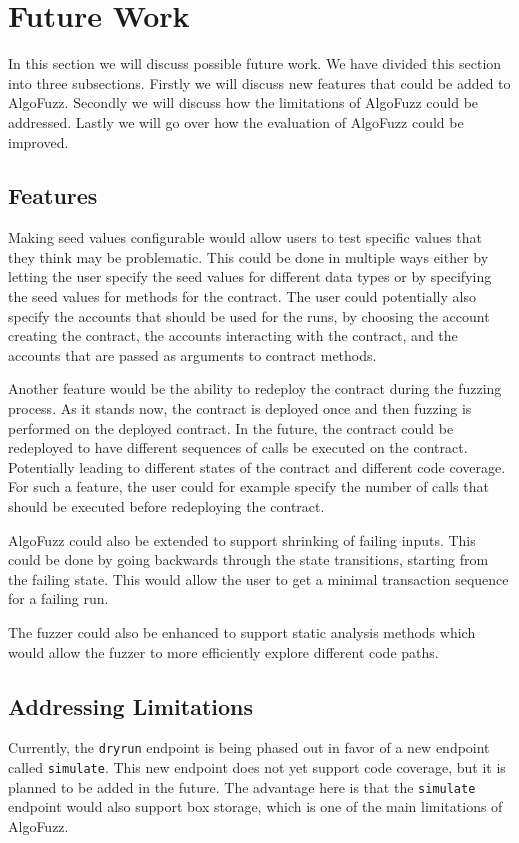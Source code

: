 \section*{Future Work}
In this section we will discuss possible future work.
We have divided this section into three subsections.
Firstly we will discuss new features that could be added to AlgoFuzz.
Secondly we will discuss how the limitations of AlgoFuzz could be addressed.
Lastly we will go over how the evaluation of AlgoFuzz could be improved.

\subsection*{Features}
Making seed values configurable would allow users to test specific values that they think may be problematic.
This could be done in multiple ways either by letting the user specify the seed values for different data types or by specifying the seed values for methods for the contract.
The user could potentially also specify the accounts that should be used for the runs, by choosing the account creating the contract, the accounts interacting with the contract, and the accounts that are passed as arguments to contract methods.

Another feature would be the ability to redeploy the contract during the fuzzing process.
As it stands now, the contract is deployed once and then fuzzing is performed on the deployed contract.
In the future, the contract could be redeployed to have different sequences of calls be executed on the contract.
Potentially leading to different states of the contract and different code coverage.
For such a feature, the user could for example specify the number of calls that should be executed before redeploying the contract.

AlgoFuzz could also be extended to support shrinking of failing inputs.
This could be done by going backwards through the state transitions, starting from the failing state.
This would allow the user to get a minimal transaction sequence for a failing run.

The fuzzer could also be enhanced to support static analysis methods which would allow the fuzzer to more efficiently explore different code paths.

\subsection*{Addressing Limitations}
Currently, the \texttt{dryrun} endpoint is being phased out in favor of a new endpoint called \texttt{simulate}.
This new endpoint does not yet support code coverage, but it is planned to be added in the future.
The advantage here is that the \texttt{simulate} endpoint would also support box storage, which is one of the main limitations of AlgoFuzz.

